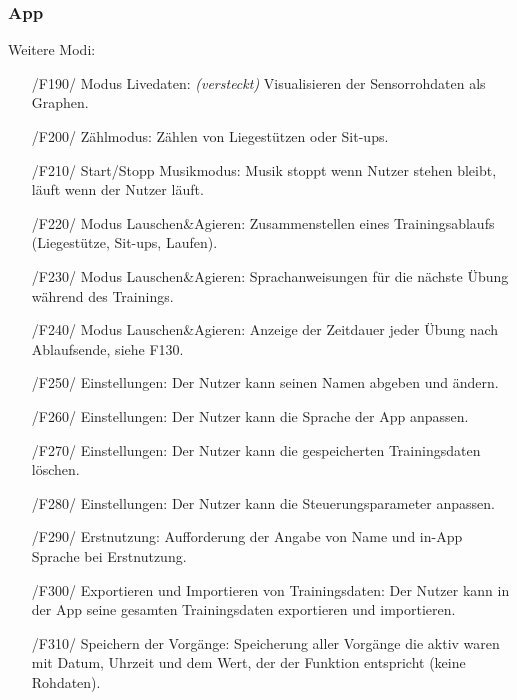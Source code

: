 \documentclass[a4paper,12pt]{article}
\begin{document}
    \subsubsection{App}
      Weitere Modi:
      \begin{itemize}
      \item[/F190/] \textsf{Modus Livedaten: \textit{(versteckt)}} Visualisieren der Sensorrohdaten als Graphen.    
      \item[/F200/] \textsf{Zählmodus:} Zählen von Liegestützen oder Sit-ups. %
      \item[/F210/] \textsf{Start/Stopp Musikmodus:} Musik stoppt wenn Nutzer stehen bleibt, läuft wenn der Nutzer läuft.
      \item[/F220/] \textsf{Modus Lauschen\&Agieren:} Zusammenstellen eines Trainingsablaufs (Liegestütze, Sit-ups, Laufen). 
      \item[/F230/] \textsf {Modus Lauschen\&Agieren:} Sprachanweisungen für die nächste Übung während des Trainings.
      \item[/F240/] \textsf {Modus Lauschen\&Agieren:} Anzeige der Zeitdauer jeder Übung nach Ablaufsende, siehe F130.
      \item[/F250/] \textsf {Einstellungen:} Der Nutzer kann seinen Namen abgeben und ändern.
      \item[/F260/] \textsf {Einstellungen:} Der Nutzer kann die Sprache der App anpassen.
      \item[/F270/] \textsf {Einstellungen:} Der Nutzer kann die gespeicherten Trainingsdaten löschen.
      \item[/F280/] \textsf {Einstellungen:} Der Nutzer kann die Steuerungsparameter anpassen. %
      \item[/F290/] \textsf {Erstnutzung:} Aufforderung der Angabe von Name und in-App Sprache bei Erstnutzung.
      \item[/F300/] \textsf{Exportieren und Importieren von Trainingsdaten:} Der Nutzer kann in der App seine gesamten Trainingsdaten exportieren und importieren.
      \item[/F310/] \textsf{Speichern der Vorgänge:} Speicherung aller Vorgänge die aktiv waren mit Datum, Uhrzeit und dem Wert, der der Funktion entspricht (keine Rohdaten).   %
      \end{itemize}
\end{document}
